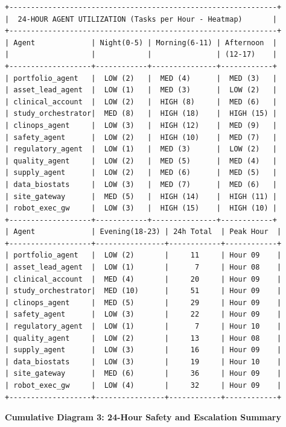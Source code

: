 \begin{verbatim}
+--------------------------------------------------------------+
|  24-HOUR AGENT UTILIZATION (Tasks per Hour - Heatmap)       |
+--------------------------------------------------------------+
| Agent             | Night(0-5) | Morning(6-11) | Afternoon  |
|                   |            |               | (12-17)    |
+-------------------+------------+---------------+------------+
| portfolio_agent   |  LOW (2)   |  MED (4)      |  MED (3)   |
| asset_lead_agent  |  LOW (1)   |  MED (3)      |  LOW (2)   |
| clinical_account  |  LOW (2)   |  HIGH (8)     |  MED (6)   |
| study_orchestrator|  MED (8)   |  HIGH (18)    |  HIGH (15) |
| clinops_agent     |  LOW (3)   |  HIGH (12)    |  MED (9)   |
| safety_agent      |  LOW (2)   |  HIGH (10)    |  MED (7)   |
| regulatory_agent  |  LOW (1)   |  MED (3)      |  LOW (2)   |
| quality_agent     |  LOW (2)   |  MED (5)      |  MED (4)   |
| supply_agent      |  LOW (2)   |  MED (6)      |  MED (5)   |
| data_biostats     |  LOW (3)   |  MED (7)      |  MED (6)   |
| site_gateway      |  MED (5)   |  HIGH (14)    |  HIGH (11) |
| robot_exec_gw     |  LOW (3)   |  HIGH (15)    |  HIGH (10) |
+-------------------+------------+---------------+------------+
| Agent             | Evening(18-23) | 24h Total  | Peak Hour  |
+-------------------+----------------+------------+------------+
| portfolio_agent   |  LOW (2)       |     11     | Hour 09    |
| asset_lead_agent  |  LOW (1)       |      7     | Hour 08    |
| clinical_account  |  MED (4)       |     20     | Hour 09    |
| study_orchestrator|  MED (10)      |     51     | Hour 09    |
| clinops_agent     |  MED (5)       |     29     | Hour 09    |
| safety_agent      |  LOW (3)       |     22     | Hour 09    |
| regulatory_agent  |  LOW (1)       |      7     | Hour 10    |
| quality_agent     |  LOW (2)       |     13     | Hour 08    |
| supply_agent      |  LOW (3)       |     16     | Hour 09    |
| data_biostats     |  LOW (3)       |     19     | Hour 10    |
| site_gateway      |  MED (6)       |     36     | Hour 09    |
| robot_exec_gw     |  LOW (4)       |     32     | Hour 09    |
+-------------------+----------------+------------+------------+
\end{verbatim}

\textbf{Cumulative Diagram 3: 24-Hour Safety and Escalation Summary}

